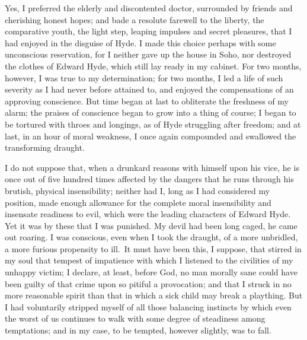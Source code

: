\documentclass[12pt,openright]{book}
\begin{document}
Yes, I preferred the elderly and discontented doctor, surrounded by friends and cherishing honest hopes; and bade a resolute farewell to the liberty, the comparative youth, the light step, leaping impulses and secret pleasures, that I had enjoyed in the disguise of Hyde. I made this choice perhaps with some unconscious reservation, for I neither gave up the house in Soho, nor destroyed the clothes of Edward Hyde, which still lay ready in my cabinet. For two months, however, I was true to my determination; for two months, I led a life of such severity as I had never before attained to, and enjoyed the compensations of an approving conscience. But time began at last to obliterate the freshness of my alarm; the praises of conscience began to grow into a thing of course; I began to be tortured with throes and longings, as of Hyde struggling after freedom; and at last, in an hour of moral weakness, I once again compounded and swallowed the transforming draught.

I do not suppose that, when a drunkard reasons with himself upon his vice, he is once out of five hundred times affected by the dangers that he runs through his brutish, physical insensibility; neither had I, long as I had considered my position, made enough allowance for the complete moral insensibility and insensate readiness to evil, which were the leading characters of Edward Hyde. Yet it was by these that I was punished. My devil had been long caged, he came out roaring. I was conscious, even when I took the draught, of a more unbridled, a more furious propensity to ill. It must have been this, I suppose, that stirred in my soul that tempest of impatience with which I listened to the civilities of my unhappy victim; I declare, at least, before God, no man morally sane could have been guilty of that crime upon so pitiful a provocation; and that I struck in no more reasonable spirit than that in which a sick child may break a plaything. But I had voluntarily stripped myself of all those balancing instincts by which even the worst of us continues to walk with some degree of steadiness among temptations; and in my case, to be tempted, however slightly, was to fall.
\end{document}
